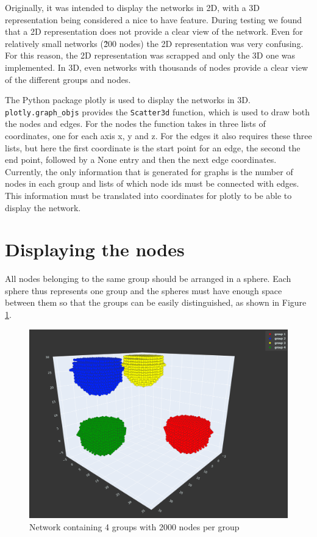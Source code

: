 Originally, it was intended to display the networks in 2D, with a 3D representation being considered a nice to have feature. During testing we found that a 2D representation does not provide a clear view of the network. Even for relatively small networks (\~200 nodes) the 2D representation was very confusing. For this reason, the 2D representation was scrapped and only the 3D one was implemented. In 3D, even networks with thousands of nodes provide a clear view of the different groups and nodes.
\newline

The Python package plotly \cite{plotly} is used to display the networks in 3D. \texttt{plotly.graph\_objs} provides the \texttt{Scatter3d} function, which is used to draw both the nodes and edges. For the nodes the function takes in three lists of coordinates, one for each axis x, y and z. For the edges it also requires these three lists, but here the first coordinate is the start point for an edge, the second the end point, followed by a None entry and then the next edge coordinates. Currently, the only information that is generated for graphs is the number of nodes in each group and lists of which node ids must be connected with edges. This information must be translated into coordinates for plotly to be able to display the network.

\section{Displaying the nodes}
\label{sub:displayNodes}
All nodes belonging to the same group should be arranged in a sphere. Each sphere thus represents one group and the spheres must have enough space between them so that the groups can be easily distinguished, as shown in Figure \ref{fig:groups}.

\begin{figure}
    \centering
    \includegraphics[width=0.75\linewidth]{images/groups.png}
    \caption{Network containing 4 groups with 2000 nodes per group}
    \label{fig:groups}
\end{figure}

